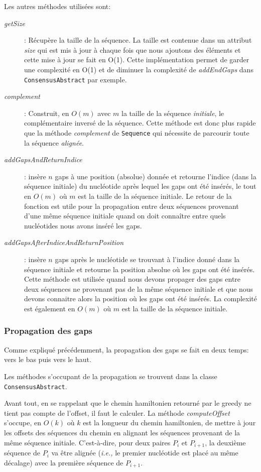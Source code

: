 Les autres méthodes utilisées sont:
\begin{description}
	\item[\emph{getSize}]: Récupère la taille de la séquence. La taille est
		contenue dans un attribut \emph{size} qui est mis à jour à chaque fois
		que nous ajoutons des éléments et cette mise à jour se fait en O(1). Cette
		implémentation permet de garder une complexité en O(1) et de diminuer la
		complexité de \emph{addEndGaps} dans \verb|ConsensusAbstract| par
		exemple.
	\item[\emph{complement}]: Construit, en $O(m)$ avec $m$ la taille de la
		séquence \textit{initiale}, le complémentaire inversé de la séquence.
		Cette méthode est donc plus rapide que la méthode \emph{complement} de
		\verb|Sequence| qui nécessite de parcourir toute la séquence
		\textit{alignée}.
	\item[\emph{addGapsAndReturnIndice}]: insère $n$ gaps à
			une position (absolue) donnée et retourne l'indice (dans la séquence
			initiale) du nucléotide après lequel les gaps ont été insérés, le
			tout en $O(m)$ où $m$ est la taille de la séquence initiale. Le
			retour de la fonction est utile pour la propagation entre deux
			séquences provenant d'une même séquence initiale quand on doit
			connaître entre quels nucléotides nous avons inséré les gaps.
	\item[\emph{addGapsAfterIndiceAndReturnPosition}]: insère $n$ gaps après
		le nucléotide se trouvant à l'indice donné dans la séquence initiale et
		retourne la position absolue où les gaps ont été insérés.
		Cette méthode est utilisée quand nous devons propager des gaps entre
		deux séquences ne provenant pas de la même séquence initiale et que nous
		devons connaitre alors la position où les gaps ont été insérés. La
		complexité est également en $O(m)$ où $m$ est la taille de la séquence
		initiale.
\end{description}

\subsubsection{Propagation des gaps}
\label{propagation_gaps}

Comme expliqué précédemment, la propagation des gaps se fait en deux temps: vers
le bas puis vers le haut.

Les méthodes s'occupant de la propagation se trouvent dans la classe
\verb|ConsensusAbstract|.

Avant tout, en se rappelant que le chemin hamiltonien retourné par le greedy ne
tient pas compte de l'offset, il faut le calculer. La méthode
\emph{computeOffset} s'occupe, en $O(k)$ où $k$ est la longueur du chemin
hamiltonien, de mettre à jour les offsets des séquences du chemin en alignant
les séquences provenant de la même séquence initiale. C'est-à-dire, pour deux
paires $P_{i}$ et $P_{i + 1}$, la deuxième séquence de $P_{i}$ va être alignée
(\emph{i.e.,} le premier nucléotide est placé au même décalage) avec la première
séquence de $P_{i + 1}$.

